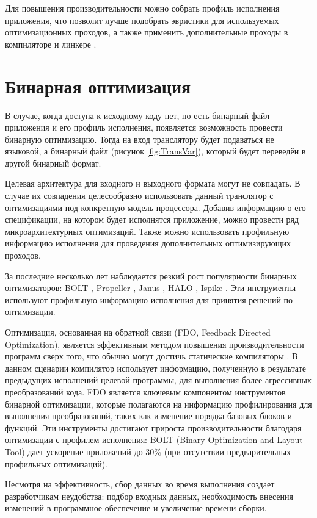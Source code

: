 Для повышения производительности можно собрать профиль исполнения приложения, что позволит лучше подобрать эвристики для используемых оптимизационных проходов, а также применить дополнительные проходы в компиляторе и линкере \cite{Licker2020}.

\section{Бинарная оптимизация}\label{sec:ch1/sec2}
В случае, когда доступа к исходному коду нет, но есть бинарный файл приложения и его профиль исполнения, появляется возможность провести бинарную оптимизацию\cite{Li2019}. Тогда на вход транслятору будет подаваться не языковой, а бинарный файл (рисунок \cref{fig:TransVar}), который будет переведён в другой бинарный формат.

Целевая архитектура для входного и выходного формата могут не совпадать. В случае их совпадения целесообразно использовать данный транслятор с оптимизациями под конкретную модель процессора. Добавив информацию о его спецификации, на котором будет исполнятся приложение, можно провести ряд микроархитектурных оптимизаций. Также можно использовать профильную информацию исполнения для проведения дополнительных оптимизирующих проходов.

За последние несколько лет наблюдается резкий рост популярности бинарных оптимизаторов: BOLT \cite{Panchenko2019}, Propeller \cite{Moreira2021}, Janus \cite{Zhou2019}, HALO \cite{Savage2020}, Ispike \cite{Luk2004}. Эти инструменты используют профильную информацию исполнения для принятия решений по оптимизации.

Оптимизация, основанная на обратной связи (FDO, Feedback Directed Optimization), является эффективным методом повышения производительности программ сверх того, что обычно могут достичь статические компиляторы \cite{Chen2016}. В данном сценарии компилятор использует информацию, полученную в результате предыдущих исполнений целевой программы, для выполнения более агрессивных преобразований кода. FDO является ключевым компонентом инструментов бинарной оптимизации, которые полагаются на информацию профилирования для выполнения преобразований, таких как изменение порядка базовых блоков и функций.
Эти инструменты достигают прироста производительности благодаря оптимизации с профилем исполнения: BOLT (Binary Optimization and Layout Tool) \cite{Panchenko2019} дает ускорение приложений до 30\% (при отсутствии предварительных профильных оптимизаций).

Несмотря на эффективность, сбор данных во время выполнения создает разработчикам неудобства: подбор входных данных, необходимость внесения изменений в программное обеспечение и увеличение времени сборки.

